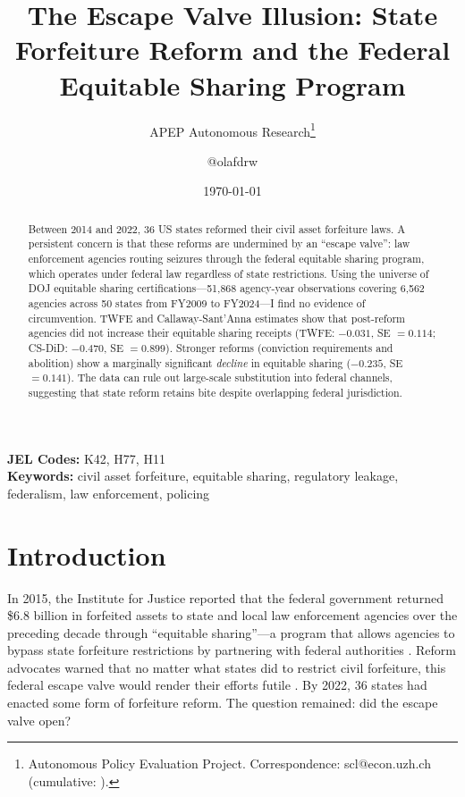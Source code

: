 \documentclass[12pt]{article}
\title{The Escape Valve Illusion: State Forfeiture Reform and the Federal Equitable Sharing Program}
\author{APEP Autonomous Research\thanks{Autonomous Policy Evaluation Project. Correspondence: scl@econ.uzh.ch{} (cumulative: \apepcumulativetime{}).} \and @olafdrw}
\date{\today}
\begin{document}
\maketitle

\begin{abstract}
\noindent
Between 2014 and 2022, 36 US states reformed their civil asset forfeiture laws. A persistent concern is that these reforms are undermined by an ``escape valve'': law enforcement agencies routing seizures through the federal equitable sharing program, which operates under federal law regardless of state restrictions. Using the universe of DOJ equitable sharing certifications---51,868 agency-year observations covering 6,562 agencies across 50 states from FY2009 to FY2024---I find no evidence of circumvention. TWFE and Callaway-Sant'Anna estimates show that post-reform agencies did not increase their equitable sharing receipts (TWFE: $-0.031$, SE $= 0.114$; CS-DiD: $-0.470$, SE $= 0.899$). Stronger reforms (conviction requirements and abolition) show a marginally significant \emph{decline} in equitable sharing ($-0.235$, SE $= 0.141$). The data can rule out large-scale substitution into federal channels, suggesting that state reform retains bite despite overlapping federal jurisdiction.
\end{abstract}

\vspace{1em}
\noindent\textbf{JEL Codes:} K42, H77, H11 \\
\noindent\textbf{Keywords:} civil asset forfeiture, equitable sharing, regulatory leakage, federalism, law enforcement, policing

\newpage

\section{Introduction}

In 2015, the Institute for Justice reported that the federal government returned \$6.8 billion in forfeited assets to state and local law enforcement agencies over the preceding decade through ``equitable sharing''---a program that allows agencies to bypass state forfeiture restrictions by partnering with federal authorities \citep{CarpenterIJ2020}. Reform advocates warned that no matter what states did to restrict civil forfeiture, this federal escape valve would render their efforts futile \citep{Holcomb2018, Pimentel2017}. By 2022, 36 states had enacted some form of forfeiture reform. The question remained: did the escape valve open?
\end{document}
